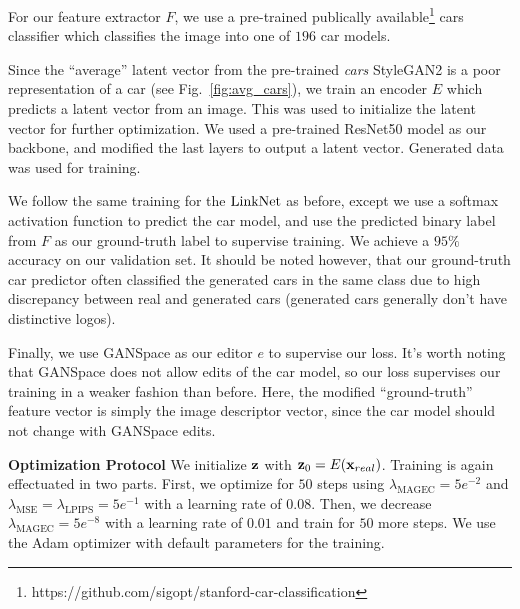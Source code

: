 For our feature extractor $F$, we use a pre-trained publically available\footnote{https://github.com/sigopt/stanford-car-classification} cars 
classifier \citep{pretrained_cars} which classifies the image 
into one of $196$ car models.

Since the ``average''
latent vector from the pre-trained \emph{cars} StyleGAN2 is a 
poor representation of a car
(see Fig.~\ref{fig:avg_cars}), we train an encoder 
$E$ which predicts a latent vector from an image. This was 
used to initialize the latent vector for further optimization.
We used a pre-trained ResNet50 model \citep{he2016resnet} 
as our backbone, and modified the last layers to output
a latent vector. Generated data was used for training.


We follow the same training for the $\mathrm{LinkNet}$ as before, except we use a 
softmax activation function to predict the car model, and use the 
predicted binary label from $F$ as our ground-truth label to supervise 
training. We achieve a $95\%$
accuracy on our validation set. It should be noted however, that our ground-truth 
   car predictor often classified the generated cars in the same class 
   due to high discrepancy
    between real and generated cars (generated cars generally
     don't have distinctive logos).

 Finally, we use GANSpace 
 \citep{harkonen2020ganspace} as our editor $e$ to supervise our \magec loss. 
 It's worth noting
that GANSpace does not allow edits of the car model, so our
\magec loss supervises our training in a weaker fashion than 
 before. Here, the modified ``ground-truth'' feature vector is 
 simply the image descriptor vector, since the car model should 
 not change with GANSpace edits.


\noindent \textbf{Optimization Protocol}  We initialize $\mathbf{z}$ with
 $\mathbf{z}_0 = E(\mathbf{x}_{real})$. Training is again effectuated in two parts.
  First, we optimize for $50$ steps using 
  $\lambda_{\text{MAGEC}}=5e^{-2}$ and $\lambda_{\text{MSE}} = \lambda_{\text{LPIPS}} = 5e^{-1}$ 
  with a learning rate of $0.08$. Then, we decrease 
  $\lambda_{\text{MAGEC}}=5e^{-8}$ with a learning rate of $0.01$ and 
  train for $50$ more steps. We use the Adam optimizer \citep{adam}
  with default parameters for  
  the training.



